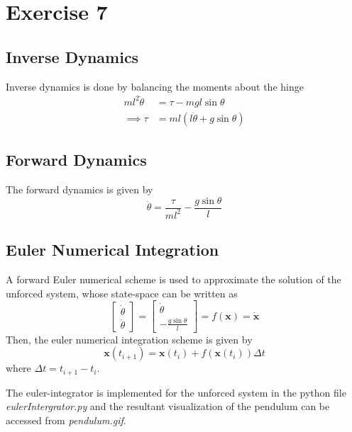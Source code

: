 \section{Exercise 7}
\subsection{Inverse Dynamics}
Inverse dynamics is done by balancing the moments about the hinge
\begin{align*}
	ml^2\ddot{\theta} &= \tau - mgl\sin\theta\\
	\implies \tau &= ml\left(l\ddot{\theta} + g\sin\theta\right)
\end{align*}
\subsection{Forward Dynamics}
The forward dynamics is given by
\begin{equation*}
	\ddot{\theta} = \frac{\tau}{ml^2} - \frac{g\sin\theta}{l}
\end{equation*}

\subsection{Euler Numerical Integration}
A forward Euler numerical scheme is used to approximate the solution of the unforced system, whose state-space can be written as
\begin{equation*}
	\begin{bmatrix}
		\dot{\theta} \\
		\ddot{\theta}
	\end{bmatrix} = \begin{bmatrix}
	\dot{\theta}\\
	-\frac{g\sin\theta}{l}
\end{bmatrix} = f\left(\bm{x}\right) = \dot{\bm{x}}
\end{equation*}
Then, the euler numerical integration scheme is given by
\begin{equation*}
	\bm{x}\left(t_{i+1}\right) = \bm{x}\left(t_{i}\right) + f\left(\bm{x}\left(t_i\right)\right)\Delta t
\end{equation*}
where $\Delta t = t_{i+1} - t_i$.

The euler-integrator is implemented for the unforced system in the python file \emph{eulerIntergrator.py} and the resultant visualization of the pendulum can be accessed from \emph{pendulum.gif}.